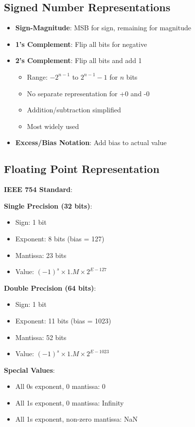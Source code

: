 \documentclass[12pt,a4paper]{report}
\begin{document}
\subsection{Signed Number Representations}
\begin{concept}
\begin{itemize}
    \item \textbf{Sign-Magnitude}: MSB for sign, remaining for magnitude
    \item \textbf{1's Complement}: Flip all bits for negative
    \item \textbf{2's Complement}: Flip all bits and add 1
        \begin{itemize}
            \item Range: $-2^{n-1}$ to $2^{n-1} - 1$ for $n$ bits
            \item No separate representation for +0 and -0
            \item Addition/subtraction simplified
            \item Most widely used
        \end{itemize}
    \item \textbf{Excess/Bias Notation}: Add bias to actual value
\end{itemize}
\end{concept}

\subsection{Floating Point Representation}
\begin{concept}
\textbf{IEEE 754 Standard}:

\textbf{Single Precision (32 bits)}:
\begin{itemize}
    \item Sign: 1 bit
    \item Exponent: 8 bits (bias = 127)
    \item Mantissa: 23 bits
    \item Value: $(-1)^s \times 1.M \times 2^{E-127}$
\end{itemize}

\textbf{Double Precision (64 bits)}:
\begin{itemize}
    \item Sign: 1 bit
    \item Exponent: 11 bits (bias = 1023)
    \item Mantissa: 52 bits
    \item Value: $(-1)^s \times 1.M \times 2^{E-1023}$
\end{itemize}

\textbf{Special Values}:
\begin{itemize}
    \item All 0s exponent, 0 mantissa: 0
    \item All 1s exponent, 0 mantissa: Infinity
    \item All 1s exponent, non-zero mantissa: NaN
\end{itemize}
\end{concept}
\end{document}
